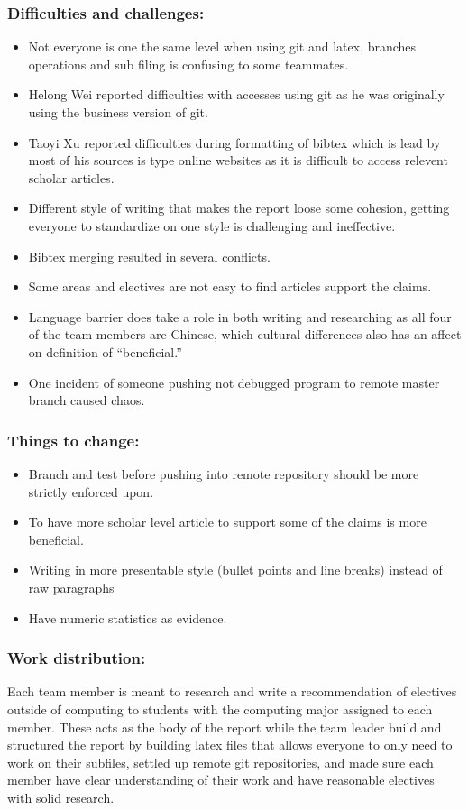 \documentclass{article}
\begin{document}
	\subsubsection{Difficulties and challenges:}
	\begin{itemize}
		\item Not everyone is one the same level when using git and latex, branches operations and sub filing is confusing to some teammates.
		\item Helong Wei reported difficulties with accesses using git as he was originally using the business version of git.
		\item Taoyi Xu reported difficulties during formatting of bibtex which is lead by most of his sources is type online websites as it is difficult to access relevent scholar articles.
		\item Different style of writing that makes the report loose some cohesion, getting everyone to standardize on one style is challenging and ineffective.
		\item Bibtex merging resulted in several conflicts.
		\item Some areas and electives are not easy to find articles support the claims.
		\item Language barrier does take a role in both writing and researching as all four of the team members are Chinese, which cultural differences also has an affect on definition of “beneficial.”
		\item One incident of someone pushing not debugged program to remote master branch caused chaos.
	\end{itemize}
	
	\subsubsection{Things to change:}
	\begin{itemize}
		\item Branch and test before pushing into remote repository should be more strictly enforced upon.
		\item To have more scholar level article to support some of the claims is more beneficial.
		\item Writing in more presentable style (bullet points and line breaks) instead of raw paragraphs
		\item Have numeric statistics as evidence.
	\end{itemize}
	
	\subsubsection{Work distribution:}
	Each team member is meant to research and write a recommendation of electives outside of computing to students with the computing major assigned to each member. These acts as the body of the report while the team leader build and structured the report by building latex files that allows everyone to only need to work on their subfiles, settled up remote git repositories, and made sure each member have clear understanding of their work and have reasonable electives with solid research.
	
\end{document}
